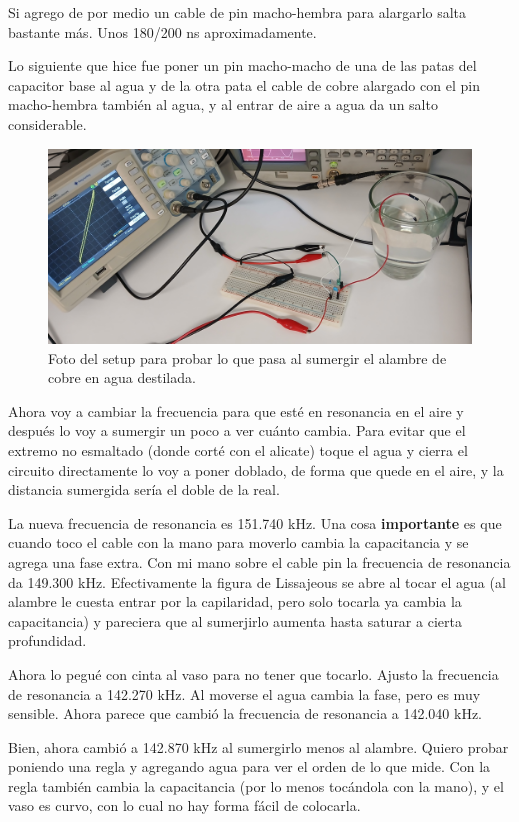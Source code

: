 Si agrego de por medio un cable de pin macho-hembra para alargarlo salta bastante más. Unos 180/200 ns aproximadamente. 

Lo siguiente que hice fue poner un pin macho-macho de una de las patas del capacitor base al agua y de la otra pata el cable de cobre alargado con el pin macho-hembra también al agua, y al entrar de aire a agua da un salto considerable.

\begin{figure}
	\centering
	\includegraphics[width=0.7\linewidth]{Figures/05_05_2025/20250507_104355.jpg}
	\caption{Foto del setup para probar lo que pasa al sumergir el alambre de cobre en agua destilada.}
	\label{fig:foto_05_05_2025}
\end{figure}

Ahora voy a cambiar la frecuencia para que esté en resonancia en el aire y después lo voy a sumergir un poco a ver cuánto cambia.
Para evitar que el extremo no esmaltado (donde corté con el alicate) toque el agua y cierra el circuito directamente lo voy a poner doblado, de forma que quede en el aire, y la distancia sumergida sería el doble de la real.

La nueva frecuencia de resonancia es 151.740 kHz. Una cosa \textbf{importante} es que cuando toco el cable con la mano para moverlo cambia la capacitancia y se agrega una fase extra. Con mi mano sobre el cable pin la frecuencia de resonancia da 149.300 kHz. Efectivamente la figura de Lissajeous se abre al tocar el agua (al alambre le cuesta entrar por la capilaridad, pero solo tocarla ya cambia la capacitancia) y pareciera que al sumerjirlo aumenta hasta saturar a cierta profundidad. 


Ahora lo pegué con cinta al vaso para no tener que tocarlo. Ajusto la frecuencia de resonancia a 142.270 kHz. Al moverse el agua cambia la fase, pero es muy sensible. Ahora parece que cambió la frecuencia de resonancia a 142.040 kHz.

Bien, ahora cambió a 142.870 kHz al sumergirlo menos al alambre. Quiero probar poniendo una regla y agregando agua para ver el orden de lo que mide. Con la regla también cambia la capacitancia (por lo menos tocándola con la mano), y el vaso es curvo, con lo cual no hay forma fácil de colocarla. 

